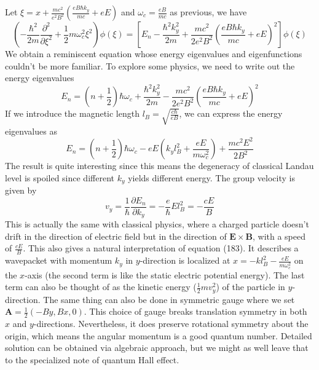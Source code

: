 \documentclass{article}
\begin{document}
\begin{equation}
\end{equation}Let $\xi=x+\frac{mc^2}{e^2B^2}(\frac{eB\hbar{k_y}}{mc}+eE)$ and $\omega_c=\frac{eB}{mc}$ as previous, we have\begin{equation}
    (-\frac{\hbar^2}{2m}\frac{\partial^2}{\partial\xi^2}+\frac12m\omega_c^2\xi^2)\phi(\xi)=[E_n-\frac{\hbar^2k_y^2}{2m}+\frac{mc^2}{2e^2B^2}(\frac{eB\hbar{k_y}}{mc}+eE)^2]\phi(\xi)
\end{equation}We obtain a reminiscent equation whose energy eigenvalues and eigenfunctions couldn't be more familiar. To explore some physics, we need to write out the energy eigenvalues\begin{equation}
    E_n=(n+\frac12)\hbar\omega_c+\frac{\hbar^2k_y^2}{2m}-\frac{mc^2}{2e^2B^2}(\frac{eB\hbar{k_y}}{mc}+eE)^2
\end{equation}If we introduce the magnetic length $l_B=\sqrt{\frac{c\hbar}{eB}}$, we can express the energy eigenvalues as\begin{equation}
    E_n=(n+\frac12)\hbar\omega_c-eE(k_yl_B^2+\frac{eE}{m\omega_c^2})+\frac{mc^2E^2}{2B^2}
\end{equation}The result is quite interesting since this means the degeneracy of classical Landau level is spoiled since different $k_y$ yields different energy. The group velocity is given by\begin{equation}
    v_y=\frac{1}{\hbar}\frac{\partial{E_n}}{\partial{k_y}}=-\frac{e}{\hbar}El_B^2=-\frac{cE}{B}
\end{equation}This is actually the same with classical physics, where a charged particle doesn't drift in the direction of electric field but in the direction of $\mathbf{E}\times\mathbf{B}$, with a speed of $\frac{cE}{B}$. This also gives a natural interpretation of equation (183). It describes a wavepacket with momentum $k_y$ in $y$-direction is localized at $x=-kl_B^2-\frac{eE}{m\omega_c^2}$ on the $x$-axis (the second term is like the static electric potential energy). The last term can also be thought of as the kinetic energy ($\frac12mv_y^2$) of the particle in $y$-direction. The same thing can also be done in symmetric gauge where we set $\mathbf{A}=\frac12(-By,Bx,0)$. This choice of gauge breaks translation symmetry in both $x$ and $y$-directions. Nevertheless, it does preserve rotational symmetry about the origin, which means the angular momentum is a good quantum number. Detailed solution can be obtained via algebraic approach, but we might as well leave that to the specialized note of quantum Hall effect.\\
\end{document}
